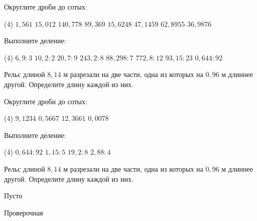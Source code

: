 \begin{class}[number=3]
	\begin{listofex}
		\item Округлите дроби до сотых:
		\begin{tasks}(4)
			\task \( 1,561 \)
			\task \( 15,012 \)
			\task \( 140,778 \)
			\task \( 89,369 \)
			\task \( 15,6248 \)
			\task \( 47,1459 \)
			\task \( 62,8955 \)
			\task \( 36,9876 \)
		\end{tasks}
		\item Выполните деление:
		\begin{tasks}(4)
			\task \( 6,9:3 \)
			\task \( 10,2:2 \)
			\task \( 20,7:9 \)
			\task \( 243,2:8 \)
			\task \( 88,298:7 \)
			\task \( 772,8:12 \)
			\task \( 93,15:23 \)
			\task \( 0,644:92 \)
		\end{tasks}
		\item Рельс длиной \( 8,14 \) м разрезали на две части, одна из которых на \( 0,96 \) м длиннее другой. Определите длину каждой из них.
	\end{listofex}
\end{class}

\begin{homework}[number=3]
	\begin{listofex}
		\item Округлите дроби до сотых:
		\begin{tasks}(4)
			\task \( 9,1234 \)
			\task \( 0,5667 \)
			\task \( 12,3661 \)
			\task \( 0,0078 \)
		\end{tasks}
		\item Выполните деление:
		\begin{tasks}(4)
			\task \( 0,644:92 \)
			\task \( 1,15:5 \)
			\task \( 19,2:8 \)
			\task \( 2,88:4 \)
		\end{tasks}
		\item Рельс длиной \( 8,14 \) м разрезали на две части, одна из которых на \( 0,96 \) м длиннее другой. Определите длину каждой из них.
	\end{listofex}
\end{homework}

\begin{class}[number=4]
	\begin{listofex}
		\item Пусто
	\end{listofex}
\end{class}


\begin{exam}
	\begin{listofex}
		\item Проверочная
	\end{listofex}
\end{exam}
